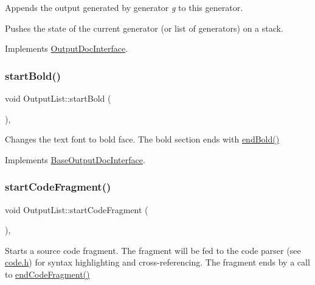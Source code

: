 Appends the output generated by generator {\itshape g} to this generator.

Pushes the state of the current generator (or list of generators) on a stack. 

Implements \mbox{\hyperlink{class_output_doc_interface_aba5fd4dd5b0360723e62fedc7d353f29}{Output\+Doc\+Interface}}.

\mbox{\label{class_output_list_a796018ee85949771252f36fea9a288d0}} 
\subsubsection{\texorpdfstring{startBold()}{startBold()}}
{\footnotesize\ttfamily void Output\+List\+::start\+Bold (\begin{DoxyParamCaption}{ }\end{DoxyParamCaption})\hspace{0.3cm}{\ttfamily [inline]}, {\ttfamily [virtual]}}

Changes the text font to bold face. The bold section ends with \mbox{\hyperlink{class_output_list_aa3f855a4e60d2a7c6769b66d43c69b23}{end\+Bold()}} 

Implements \mbox{\hyperlink{class_base_output_doc_interface_aa0bfe5ef08077a7191ba4666f47c441b}{Base\+Output\+Doc\+Interface}}.

\mbox{\label{class_output_list_ae9d700d50e148d13422052cd58243624}} 
\subsubsection{\texorpdfstring{startCodeFragment()}{startCodeFragment()}}
{\footnotesize\ttfamily void Output\+List\+::start\+Code\+Fragment (\begin{DoxyParamCaption}{ }\end{DoxyParamCaption})\hspace{0.3cm}{\ttfamily [inline]}, {\ttfamily [virtual]}}

Starts a source code fragment. The fragment will be fed to the code parser (see \mbox{\hyperlink{code_8h_source}{code.\+h}}) for syntax highlighting and cross-\/referencing. The fragment ends by a call to \mbox{\hyperlink{class_output_list_a9fccddf083f487654f6e6ce261fafff8}{end\+Code\+Fragment()}} 

